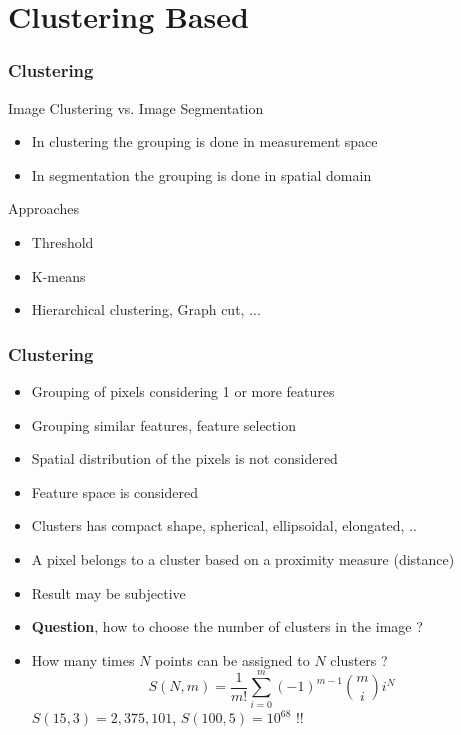 \documentclass{beamer}
\begin{document}
\section{Clustering Based}

\begin{frame}
\frametitle{Clustering}
\begin{block}{Image Clustering vs. Image Segmentation}
\begin{itemize}
\item In clustering the grouping is done in measurement space
\item In segmentation the grouping is done in spatial domain
\end{itemize}
\end{block}

\begin{block}{Approaches}
\begin{itemize}
\item Threshold
\item K-means
\item Hierarchical clustering, Graph cut, ...
\end{itemize}
\end{block}
\end{frame}

\begin{frame}
\frametitle{Clustering}
\footnotesize{
\begin{itemize}
\item Grouping of pixels considering 1 or more features
\item Grouping similar features, feature selection
\item Spatial distribution of the pixels is not considered 
\item Feature space is considered
\item Clusters has compact shape, spherical, ellipsoidal, elongated, .. 
\item A pixel belongs to a cluster based on a proximity measure (distance)
\item Result may be subjective
\item \textbf{Question}, how to choose the number of clusters in the image ? 
\item How many times $N$ points can be assigned to $N$ clusters ? 
$$S(N,m) = \frac{1}{m!}\sum\limits_{i = 0}^{m}(-1)^{m-1}{m \choose i}i^N$$
$S(15,3) = 2,375,101$, $S(100,5)= 10 ^{68}$ !!
\end{itemize}
}
\end{frame}
\end{document}
